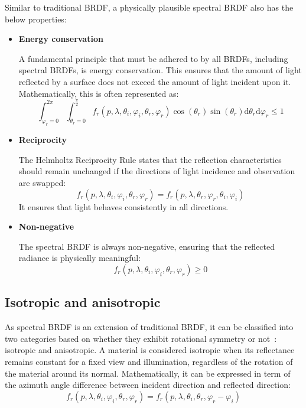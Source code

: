 Similar to traditional BRDF, a physically plausible spectral BRDF also has the below properties:
\begin{itemize}
    \item \textbf{Energy conservation}

          A fundamental principle that must be adhered to by all BRDFs, including spectral BRDFs, is energy conservation.
          This ensures that the amount of light reflected by a surface does not exceed the amount of light incident upon it.
          Mathematically, this is often represented as:
          \[
              \int_{\varphi_r = 0}^{2\pi} \int_{\theta_r =0}^{\frac{\pi}{2}} f_r(p, \lambda, \theta_i, \varphi_i, \theta_r, \varphi_r) \cos(\theta_r) \sin(\theta_r) \mathrm{d}\theta_r \mathrm{d}\varphi_r \le 1
          \]
    \item \textbf{Reciprocity}

          The Helmholtz Reciprocity Rule states that the reflection characteristics should remain unchanged if the directions of light incidence and observation are swapped:
          \[
              f_r(p, \lambda, \theta_i, \varphi_i, \theta_r, \varphi_r)  = f_r(p, \lambda,  \theta_r, \varphi_r, \theta_i, \varphi_i)
          \]
          It ensures that light behaves consistently in all directions.


    \item \textbf{Non-negative}

          The spectral BRDF is always non-negative, ensuring that the reflected radiance is physically meaningful:
          \[
              f_r(p, \lambda, \theta_i, \varphi_i, \theta_r, \varphi_r) \ge 0
          \]
\end{itemize}

\subsection{Isotropic and anisotropic}

As spectral BRDF is an extension of traditional BRDF, it can be classified into two categories based on whether they exhibit rotational symmetry or not~\cite{2012_Montes, 2015_Filip}: isotropic and anisotropic.
A material is considered isotropic when its reflectance remains constant for a fixed view and illumination, regardless of the rotation of the material around its normal.
Mathematically, it can be expressed in term of the azimuth angle difference between incident direction and reflected direction:
\[
    f_r(p, \lambda, \theta_i, \varphi_i, \theta_r, \varphi_r) = f_r(p, \lambda, \theta_i, \theta_r, \varphi_r - \varphi_i)
\]

